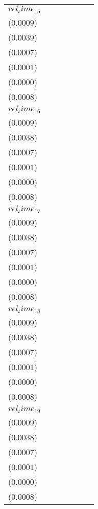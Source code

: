 \begin{tabular}{lllllll}
$rel_time_15$ & \makecell{$0.0040^{***}$ \\ ($0.0009$)} & \makecell{$0.0158^{***}$ \\ ($0.0039$)} & \makecell{$-0.0001^{}$ \\ ($0.0007$)} & \makecell{$0.0001^{}$ \\ ($0.0001$)} & \makecell{$0.0000^{}$ \\ ($0.0000$)} & \makecell{$0.0035^{***}$ \\ ($0.0008$)} \\
$rel_time_16$ & \makecell{$0.0038^{***}$ \\ ($0.0009$)} & \makecell{$0.0140^{***}$ \\ ($0.0038$)} & \makecell{$0.0014^{**}$ \\ ($0.0007$)} & \makecell{$0.0003^{***}$ \\ ($0.0001$)} & \makecell{$0.0001^{***}$ \\ ($0.0000$)} & \makecell{$0.0040^{***}$ \\ ($0.0008$)} \\
$rel_time_17$ & \makecell{$0.0032^{***}$ \\ ($0.0009$)} & \makecell{$0.0124^{***}$ \\ ($0.0038$)} & \makecell{$0.0006^{}$ \\ ($0.0007$)} & \makecell{$0.0001^{*}$ \\ ($0.0001$)} & \makecell{$0.0001^{**}$ \\ ($0.0000$)} & \makecell{$0.0032^{***}$ \\ ($0.0008$)} \\
$rel_time_18$ & \makecell{$0.0041^{***}$ \\ ($0.0009$)} & \makecell{$0.0168^{***}$ \\ ($0.0038$)} & \makecell{$0.0009^{}$ \\ ($0.0007$)} & \makecell{$0.0002^{*}$ \\ ($0.0001$)} & \makecell{$0.0001^{***}$ \\ ($0.0000$)} & \makecell{$0.0036^{***}$ \\ ($0.0008$)} \\
$rel_time_19$ & \makecell{$0.0051^{***}$ \\ ($0.0009$)} & \makecell{$0.0224^{***}$ \\ ($0.0038$)} & \makecell{$-0.0011^{}$ \\ ($0.0007$)} & \makecell{$-0.0000^{}$ \\ ($0.0001$)} & \makecell{$-0.0000^{}$ \\ ($0.0000$)} & \makecell{$0.0040^{***}$ \\ ($0.0008$)} \\

\end{tabular}
